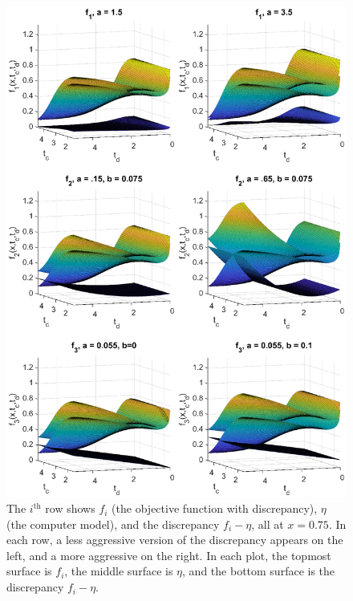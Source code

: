 \documentclass[12pt]{article}
\begin{document}
\begin{figure}
	\centering
	\includegraphics[scale=0.85]{FIG_six_discrepancies.eps}
	\captionsetup{width=.85\linewidth}
	\caption{The $i^{\text{th}}$ row shows $f_i$ (the objective function with discrepancy), $\eta$ (the computer model), and the discrepancy $f_i-\eta$, all at $x=0.75$. In each row, a less aggressive version of the discrepancy appears on the left, and a more aggressive on the right. In each plot, the topmost surface is $f_i$, the middle surface is $\eta$, and the bottom surface is the discrepancy $f_i-\eta$.}
	\label{fig:discrepancies}
\end{figure}
%
\end{document}
